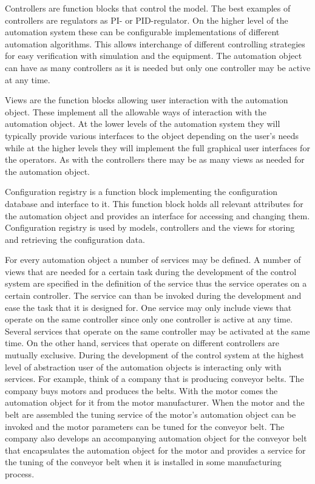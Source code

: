 Controllers are function blocks that control the model. The
best examples of controllers are regulators as PI- or
PID-regulator. On the higher level of the automation system
these can be configurable implementations of different
automation algorithms. This allows interchange of different
controlling strategies for easy verification with simulation
and the equipment. The automation object can have as many
controllers as it is needed but only one controller may be
active at any time.

Views are the function blocks allowing user interaction with
the automation object. These implement all the allowable ways
of interaction with the automation object. At the lower
levels of the automation system they will typically provide
various interfaces to the object depending on the user's
needs while at the higher levels they will implement the
full graphical user interfaces for the operators. As with
the controllers there may be as many views as needed for the
automation object.

Configuration registry is a function block implementing the
configuration database and interface to it. This
function block holds all relevant attributes for the
automation object and provides an interface for accessing
and changing them. Configuration registry is used by models,
controllers and the views for storing and retrieving the
configuration data.

For every automation object a number of services may be
defined. A number of views that are needed for a certain
task during the development of the control system are
specified in the definition of the service thus the service
operates on a certain controller. The service can than be
invoked during the development and ease the task that it is
designed for. One service may only include views that
operate on the same controller since only one controller is
active at any time. Several services that operate on the
same controller may be activated at the same time. On the
other hand, services that operate on different controllers
are mutually exclusive. During the development of the
control system at the highest level of abstraction user of
the automation objects is interacting only with services.
For example, think of a company that is producing conveyor
belts. The company buys motors and produces the belts. With
the motor comes the automation object for it from the motor
manufacturer. When the motor and the belt are assembled the
tuning service of the motor's automation object can be
invoked and the motor parameters can be tuned for the
conveyor belt. The company also develops an accompanying
automation object for the conveyor belt that encapsulates
the automation object for the motor and provides a service
for the tuning of the conveyor belt when it is installed in
some manufacturing process.

